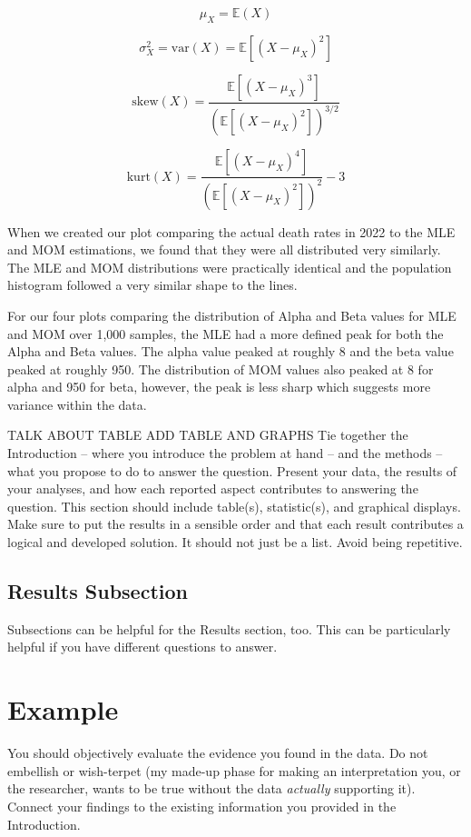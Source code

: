 \documentclass{article}\usepackage[]{graphicx}\usepackage[]{xcolor}
\begin{document}
\begin{multicols}{2}
\[
\mu_X = \mathbb{E}(X)
\]

\[
\sigma_X^2 = \mathrm{var}(X) = \mathbb{E} \left[ (X - \mu_X)^2 \right]
\]

\[
\mathrm{skew}(X) = \frac{\mathbb{E} \left[ (X - \mu_X)^3 \right]}{\left( \mathbb{E} \left[ (X - \mu_X)^2 \right] \right)^{3/2}}
\]

\[
\mathrm{kurt}(X) = \frac{\mathbb{E} \left[ (X - \mu_X)^4 \right]}{\left( \mathbb{E} \left[ (X - \mu_X)^2 \right] \right)^2} - 3
\]





When we created our plot comparing the actual death rates in 2022 to the MLE and MOM estimations, we found that they were all distributed very similarly. The MLE and MOM distributions were practically identical and the population histogram followed a very similar shape to the lines. 

For our four plots comparing the distribution of Alpha and Beta values for MLE and MOM over 1,000 samples, the MLE had a 
more defined peak for both the Alpha and Beta values. The alpha value peaked at roughly 8 and the beta value 
peaked at roughly 950. The distribution of MOM values also peaked at 8 for alpha and 950 for beta, however, the peak is 
less sharp which suggests more variance within the data.  

TALK ABOUT TABLE
ADD TABLE AND GRAPHS
Tie together the Introduction -- where you introduce the problem at hand -- and the methods --  what you propose to do to answer the question. Present your data, the results of your analyses, and how each reported aspect contributes to answering the question. This section should include table(s), statistic(s), and graphical displays. Make sure to put the results in a sensible order and that each result contributes a logical and developed solution. It should not just be a list. Avoid being repetitive. 

\subsection{Results Subsection}
Subsections can be helpful for the Results section, too. This can be particularly helpful if you have different questions to answer. 


\section{Example}

 You should objectively evaluate the evidence you found in the data. Do not embellish or wish-terpet (my made-up phase for making an interpretation you, or the researcher, wants to be true without the data \emph{actually} supporting it). Connect your findings to the existing information you provided in the Introduction.


\end{multicols}
\end{document}
